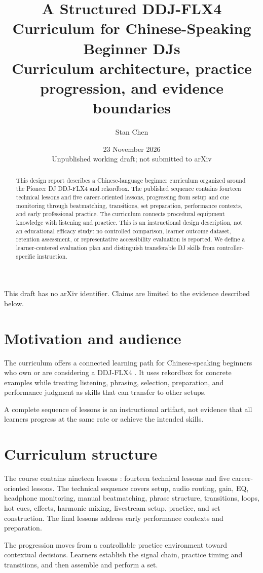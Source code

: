 \documentclass[11pt]{article}
\title{A Structured DDJ-FLX4 Curriculum for Chinese-Speaking Beginner DJs\\\large Curriculum architecture, practice progression, and evidence boundaries}
\author{Stan Chen}
\date{23 November 2026\\[4pt]\small Unpublished working draft; not submitted to arXiv}
\begin{document}
\maketitle
\begin{center}\small This draft has no arXiv identifier. Claims are limited to the evidence described below.\end{center}
\begin{abstract}
This design report describes a Chinese-language beginner curriculum organized around the Pioneer DJ DDJ-FLX4 and rekordbox. The published sequence contains fourteen technical lessons and five career-oriented lessons, progressing from setup and cue monitoring through beatmatching, transitions, set preparation, performance contexts, and early professional practice. The curriculum connects procedural equipment knowledge with listening and practice. This is an instructional design description, not an educational efficacy study: no controlled comparison, learner outcome dataset, retention assessment, or representative accessibility evaluation is reported. We define a learner-centered evaluation plan and distinguish transferable DJ skills from controller-specific instruction.
\end{abstract}
\section{Motivation and audience}
The curriculum offers a connected learning path for Chinese-speaking beginners who own or are considering a DDJ-FLX4 \cite{r1}. It uses rekordbox \cite{r2} for concrete examples while treating listening, phrasing, selection, preparation, and performance judgment as skills that can transfer to other setups.\par
A complete sequence of lessons is an instructional artifact, not evidence that all learners progress at the same rate or achieve the intended skills.\par
\section{Curriculum structure}
The course contains nineteen lessons \cite{r3}: fourteen technical lessons and five career-oriented lessons. The technical sequence covers setup, audio routing, gain, EQ, headphone monitoring, manual beatmatching, phrase structure, transitions, loops, hot cues, effects, harmonic mixing, livestream setup, practice, and set construction. The final lessons address early performance contexts and preparation.\par
The progression moves from a controllable practice environment toward contextual decisions. Learners establish the signal chain, practice timing and transitions, and then assemble and perform a set.\par
\end{document}
